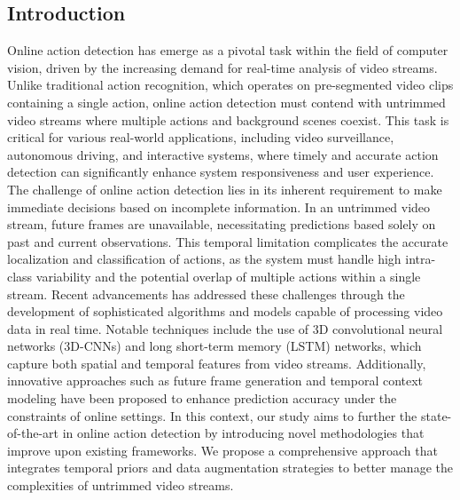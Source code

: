 \subsection{Introduction} {

Online action detection has emerge as a pivotal task within the field of computer vision, driven by the increasing demand for real-time analysis of video streams. Unlike traditional action recognition, which operates on pre-segmented video clips containing a single action, online action detection must contend with untrimmed video streams where multiple actions and background scenes coexist. This task is critical for various real-world applications, including video surveillance, autonomous driving, and interactive systems, where timely and accurate action detection can significantly enhance system responsiveness and user experience.
\vspace{12pt}
The challenge of online action detection lies in its inherent requirement to make immediate decisions based on incomplete information. In an untrimmed video stream, future frames are unavailable, necessitating predictions based solely on past and current observations. This temporal limitation complicates the accurate localization and classification of actions, as the system must handle high intra-class variability and the potential overlap of multiple actions within a single stream.
\vspace{12pt}
Recent advancements has addressed these challenges through the development of sophisticated algorithms and models capable of processing video data in real time. Notable techniques include the use of 3D convolutional neural networks (3D-CNNs) and long short-term memory (LSTM) networks, which capture both spatial and temporal features from video streams. Additionally, innovative approaches such as future frame generation and temporal context modeling have been proposed to enhance prediction accuracy under the constraints of online settings.
\vspace{12pt}
In this context, our study aims to further the state-of-the-art in online action detection by introducing novel methodologies that improve upon existing frameworks. We propose a comprehensive approach that integrates temporal priors and data augmentation strategies to better manage the complexities of untrimmed video streams.
}